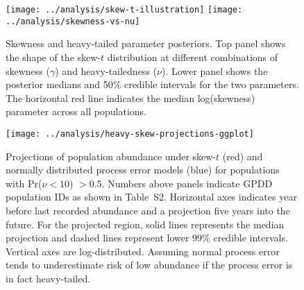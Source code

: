 \documentclass[12pt]{article}
\begin{document}
\clearpage

\begin{figure}[htbp]
\begin{center}
\texttt{[image: ../analysis/skew-t-illustration]}
\texttt{[image: ../analysis/skewness-vs-nu]}

\caption{Skewness and heavy-tailed parameter posteriors. Top panel shows the shape of the skew-$t$ distribution at different combinations of skewness ($\gamma$) and heavy-tailedness ($\nu$). Lower panel shows the posterior medians and 50\% credible intervals for the two parameters. The horizontal red line indicates the median log(skewness) parameter across all populations.}

\label{fig:skew-nu}
\end{center}
\end{figure}

\begin{figure}[htbp]
\begin{center}
\texttt{[image: ../analysis/heavy-skew-projections-ggplot]}
\caption{Projections of population abundance under skew-$t$ (red) and
normally distributed process error models (blue) for populations with
Pr($\nu<10$) $>0.5$. Numbers above panels indicate GPDD population IDs as
shown in Table~S2. Horizontal axes indicates year before last
recorded abundance and a projection five years into the future. For the
projected region, solid lines represents the median projection and
dashed lines represent lower 99\% credible intervals. Vertical axes are
log-distributed. Assuming normal process error tends to underestimate risk of
low abundance if the process error is in fact heavy-tailed.}

\label{fig:skew-projections}
\end{center}
\end{figure}

%




%
%
%
\end{document}
